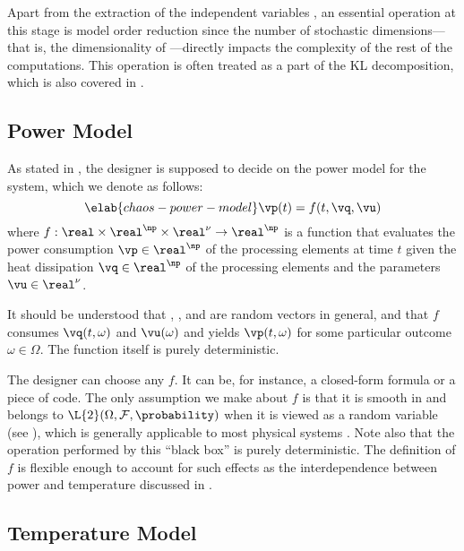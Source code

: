 Apart from the extraction of the independent variables \vz, an essential
operation at this stage is model order reduction since the number of stochastic
dimensions---that is, the dimensionality of \vz---directly impacts the
complexity of the rest of the computations. This operation is often treated as a
part of the \ac{KL} decomposition, which is also covered in
.

\subsection{Power Model}

As stated in , the designer is supposed to decide on the
power model for the system, which we denote as follows:
\begin{equation} \elab{chaos-power-model}
  \vp(t) = f(t, \vq, \vu)
\end{equation}
where $f: \real \times \real^\np \times \real^\nu \to \real^\np$ is a function
that evaluates the power consumption $\vp \in \real^\np$ of the processing
elements at time $t$ given the heat dissipation $\vq \in \real^\np$ of the
processing elements and the parameters $\vu \in \real^\nu$.

\begin{remark}
It should be understood that \vp, \vq, and \vu are random vectors in general,
and that $f$ consumes $\vq(t, \omega)$ and $\vu(\omega)$ and yields $\vp(t,
\omega)$ for some particular outcome $\omega \in \Omega$. The function itself is
purely deterministic.
\end{remark}

The designer can choose any $f$. It can be, for instance, a closed-form formula
or a piece of code. The only assumption we make about $f$ is that it is smooth
in \vz and belongs to $\L{2}(\Omega, \mathcal{F}, \probability)$ when it is
viewed as a random variable (see ), which is generally
applicable to most physical systems \cite{xiu2010}. Note also that the operation
performed by this ``black box'' is purely deterministic. The definition of $f$
is flexible enough to account for such effects as the interdependence between
power and temperature discussed in .

\subsection{Temperature Model}

